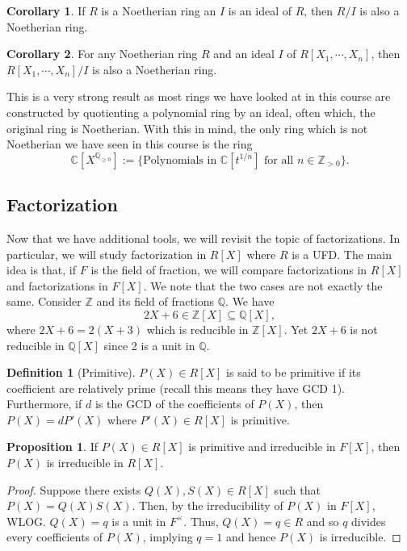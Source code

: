 \documentclass[]{article}
\theoremstyle{definition}
\newtheorem{corollary}{Corollary}[theorem]
\theoremstyle{definition}
\newtheorem{definition}{Definition}[section]
\newtheorem{proposition}{Proposition}[section]
\begin{document}
\begin{corollary}
  If \(R\) is a Noetherian ring an \(I\) is an ideal of \(R\), then 
  \(R / I\) is also a Noetherian ring.
\end{corollary}

\begin{corollary}
  For any Noetherian ring \(R\) and an ideal \(I\) of \(R[X_1, \cdots, X_n]\), 
  then \(R[X_1, \cdots, X_n] / I\) is also a Noetherian ring.
\end{corollary}

This is a very strong result as most rings we have looked at in this course 
are constructed by quotienting a polynomial ring by an ideal, often 
which, the original ring is Noetherian. With this in mind, the only ring 
which is not Noetherian we have seen in this course is the ring 
\[\mathbb{C}[X^{\mathbb{Q}_{\ge 0}}] := \{\text{Polynomials in 
\(\mathbb{C}[t^{1 / n}]\) for all \(n \in \mathbb{Z}_{>0}\)}\}.\]

\subsection{Factorization}

Now that we have additional tools, we will revisit the topic of factorizations. 
In particular, we will study factorization in \(R[X]\) where \(R\) is a UFD.
The main idea is that, if \(F\) is the field of fraction, we will compare 
factorizations in \(R[X]\) and factorizations in \(F[X]\). We note that 
the two cases are not exactly the same. Consider \(\mathbb{Z}\) and its field 
of fractions \(\mathbb{Q}\). We have 
\[2X + 6 \in \mathbb{Z}[X] \subseteq \mathbb{Q}[X],\]
where \(2X + 6 = 2(X + 3)\) which is reducible in \(\mathbb{Z}[X]\). Yet 
\(2X + 6\) is not reducible in \(\mathbb{Q}[X]\) since 2 is a unit in \(\mathbb{Q}\).

\begin{definition}[Primitive]
  \(P(X) \in R[X]\) is said to be primitive if its coefficient are relatively 
  prime (recall this means they have GCD 1). Furthermore, if \(d\) 
  is the GCD of the coefficients of \(P(X)\), then \(P(X) = d P'(X)\) 
  where \(P'(X) \in R[X]\) is primitive.
\end{definition}

\begin{proposition}
  If \(P(X) \in R[X]\) is primitive and irreducible in \(F[X]\), then 
  \(P(X)\) is irreducible in \(R[X]\). 
\end{proposition}
\begin{proof}
  Suppose there exists \(Q(X), S(X) \in R[X]\) such that \(P(X) = Q(X)S(X)\). 
  Then, by the irreducibility of \(P(X)\) in \(F[X]\), WLOG. \(Q(X) = q\) is 
  a unit in \(F^\times\). Thus, \(Q(X) = q \in R\) and so \(q\) divides every 
  coefficients of \(P(X)\), implying \(q = 1\) and hence \(P(X)\) is irreducible. 
\end{proof}
\end{document}
